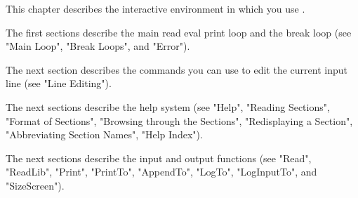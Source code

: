 
This  chapter describes the  interactive  environment in  which  you  use
{\GAP}.

The first sections describe  the main read  eval print loop and the break
loop (see "Main Loop", "Break Loops", and "Error").

The next section describes the commands you  can use to edit  the current
input line (see "Line Editing").

The next sections describe the {\GAP} help  system (see  "Help", "Reading
Sections",  "Format of Sections",    "Browsing through   the   Sections",
"Redisplaying a Section", "Abbreviating Section Names", "Help Index").

The next sections  describe  the input and output functions  (see "Read",
"ReadLib", "Print",  "PrintTo",  "AppendTo",  "LogTo", "LogInputTo",  and
"SizeScreen").

